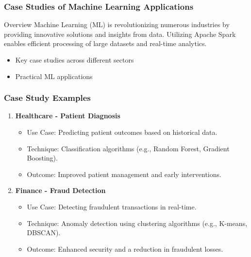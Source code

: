 \documentclass[aspectratio=169]{beamer}
\begin{document}
\begin{frame}[fragile]
    \frametitle{Case Studies of Machine Learning Applications}
    
    \begin{block}{Overview}
        Machine Learning (ML) is revolutionizing numerous industries by providing innovative solutions and insights from data. Utilizing Apache Spark enables efficient processing of large datasets and real-time analytics.
    \end{block}
    
    \begin{itemize}
        \item Key case studies across different sectors
        \item Practical ML applications
    \end{itemize}
\end{frame}

\begin{frame}[fragile]
    \frametitle{Case Study Examples}
    
    \begin{enumerate}
        \item \textbf{Healthcare - Patient Diagnosis}
        \begin{itemize}
            \item Use Case: Predicting patient outcomes based on historical data.
            \item Technique: Classification algorithms (e.g., Random Forest, Gradient Boosting).
            \item Outcome: Improved patient management and early interventions.
        \end{itemize}

        \item \textbf{Finance - Fraud Detection}
        \begin{itemize}
            \item Use Case: Detecting fraudulent transactions in real-time.
            \item Technique: Anomaly detection using clustering algorithms (e.g., K-means, DBSCAN).
            \item Outcome: Enhanced security and a reduction in fraudulent losses.
        \end{itemize}
    \end{enumerate}
\end{frame}
\end{document}
